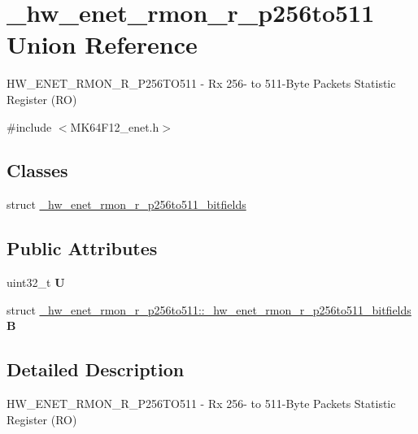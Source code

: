 \hypertarget{union__hw__enet__rmon__r__p256to511}{}\section{\+\_\+hw\+\_\+enet\+\_\+rmon\+\_\+r\+\_\+p256to511 Union Reference}
\label{union__hw__enet__rmon__r__p256to511}


H\+W\+\_\+\+E\+N\+E\+T\+\_\+\+R\+M\+O\+N\+\_\+\+R\+\_\+\+P256\+T\+O511 -\/ Rx 256-\/ to 511-\/\+Byte Packets Statistic Register (RO)  




{\ttfamily \#include $<$M\+K64\+F12\+\_\+enet.\+h$>$}

\subsection*{Classes}
\begin{DoxyCompactItemize}
\item 
struct \hyperlink{struct__hw__enet__rmon__r__p256to511_1_1__hw__enet__rmon__r__p256to511__bitfields}{\+\_\+hw\+\_\+enet\+\_\+rmon\+\_\+r\+\_\+p256to511\+\_\+bitfields}
\end{DoxyCompactItemize}
\subsection*{Public Attributes}
\begin{DoxyCompactItemize}
\item 
uint32\+\_\+t {\bfseries U}\hypertarget{union__hw__enet__rmon__r__p256to511_ae687252b3b4118d53b73125e710050a8}{}\label{union__hw__enet__rmon__r__p256to511_ae687252b3b4118d53b73125e710050a8}

\item 
struct \hyperlink{struct__hw__enet__rmon__r__p256to511_1_1__hw__enet__rmon__r__p256to511__bitfields}{\+\_\+hw\+\_\+enet\+\_\+rmon\+\_\+r\+\_\+p256to511\+::\+\_\+hw\+\_\+enet\+\_\+rmon\+\_\+r\+\_\+p256to511\+\_\+bitfields} {\bfseries B}\hypertarget{union__hw__enet__rmon__r__p256to511_a9a9c0401e5bca85e3dc1ef4e691a85ff}{}\label{union__hw__enet__rmon__r__p256to511_a9a9c0401e5bca85e3dc1ef4e691a85ff}

\end{DoxyCompactItemize}


\subsection{Detailed Description}
H\+W\+\_\+\+E\+N\+E\+T\+\_\+\+R\+M\+O\+N\+\_\+\+R\+\_\+\+P256\+T\+O511 -\/ Rx 256-\/ to 511-\/\+Byte Packets Statistic Register (RO) 

